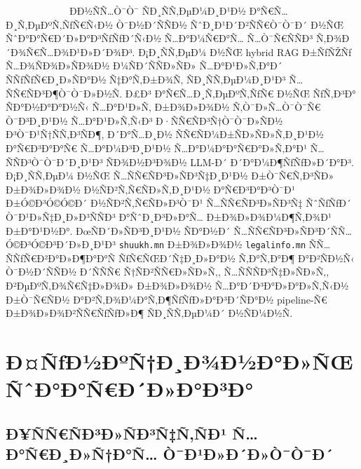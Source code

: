 \documentclass[12pt,A4]{report}
\begin{document}
\ \ \ \ \ \ \ \ \  \ \ \ \ Ð­Ð½ÑÑ…Ò¯Ò¯ ÑÐ¸ÑÑ‚ÐµÐ¼Ð¸Ð¹Ð½ Ð°Ñ€Ñ…Ð¸Ñ‚ÐµÐºÑ‚ÑƒÑ€Ñ‹Ð½ Ò¯Ð½Ð´ÑÑÐ½
ÑˆÐ¸Ð¹Ð´Ð²ÑÑ€Ò¯Ò¯Ð´ Ð½ÑŒ ÑˆÐ°Ð°Ñ€Ð´Ð»Ð°Ð³ÑƒÑƒÐ´Ñ‹Ð½ Ñ…Ð°Ð¼Ñ€Ð°Ñ… Ñ…Ò¯Ñ€ÑÑÐ³ Ñ‚Ð¾Ð´Ð¾Ñ€Ñ…Ð¾Ð¹Ð»Ð´Ð¾Ð³.
Ð¡Ð¸ÑÑ‚ÐµÐ¼ Ð½ÑŒ hybrid RAG Ð±ÑƒÑŽÑƒ Ñ…Ð¾ÑÐ¾Ð»ÑÐ¾Ð½ Ð¼ÑÐ´ÑÑÐ»ÑÐ» Ñ…Ð°Ð¹Ð»Ñ‚Ð°Ð´
ÑÑƒÑƒÑ€Ð¸Ð»ÑÐ°Ð½ Ñ‡Ð°Ñ‚Ð±Ð¾Ñ‚ ÑÐ¸ÑÑ‚ÐµÐ¼Ð¸Ð¹Ð³ Ñ…ÑÑ€ÑÐ³Ð¶Ò¯Ò¯Ð»Ð½Ñ. Ð£Ð³ Ð°Ñ€Ñ…Ð¸Ñ‚ÐµÐºÑ‚ÑƒÑ€ Ð½ÑŒ
ÑƒÑ‚Ð³Ð° ÑÐ°Ð½Ð°Ð°Ð½Ñ‹ Ñ…Ð°Ð¹Ð»Ñ‚ Ð±Ð¾Ð»Ð¾Ð½ Ñ‚Ò¯Ð»Ñ…Ò¯Ò¯Ñ€ Ò¯Ð³Ð¸Ð¹Ð½ Ñ…Ð°Ð¹Ð»Ñ‚Ñ‹Ð³ Ð·ÑÑ€ÑÐ³Ñ†Ò¯Ò¯Ð»ÑÐ½
Ð³Ò¯Ð¹Ñ†ÑÑ‚Ð³ÑÐ¶, Ð´Ð°Ñ…Ð¸Ð½ ÑÑ€ÑÐ¼Ð±ÑÐ»ÑÐ»Ñ‚Ð¸Ð¹Ð½ Ð°Ñ€Ð³Ð°Ð°Ñ€ Ñ…Ð°Ð¼Ð³Ð¸Ð¹Ð½ Ñ…Ð°Ð¼Ð°Ð°Ñ€Ð°Ð»Ñ‚Ð°Ð¹
Ñ…ÑÑÐ³Ò¯Ò¯Ð´Ð¸Ð¹Ð³ ÑÐ¾Ð½Ð³Ð¾Ð½ LLM-Ð´ Ð´Ð°Ð¼Ð¶ÑƒÑƒÐ»Ð´Ð°Ð³. Ð¡Ð¸ÑÑ‚ÐµÐ¼ Ð½ÑŒ Ñ…ÑÑ€ÑÐ³Ð»ÑÐ³Ñ‡Ð¸Ð¹Ð½
Ð±Ò¯Ñ€Ñ‚Ð³ÑÐ» Ð±Ð¾Ð»Ð¾Ð½ Ð½ÑÐ²Ñ‚Ñ€ÑÐ»Ñ‚Ð¸Ð¹Ð½ Ð°Ñ€Ð³Ð°Ð³Ò¯Ð¹ Ð±Ó©Ð³Ó©Ó©Ð´ Ð½ÑÐ²Ñ‚Ñ€ÑÐ»Ð³Ò¯Ð¹
Ñ…ÑÑ€ÑÐ³Ð»ÑÐ³Ñ‡ ÑˆÑƒÑƒÐ´ Ò¯Ð¹Ð»Ñ‡Ð¸Ð»Ð³ÑÑÐ³ Ð°ÑˆÐ¸Ð³Ð»Ð°Ñ… Ð±Ð¾Ð»Ð¾Ð¼Ð¶Ñ‚Ð¾Ð¹ Ð±Ð°Ð¹Ð½Ð°. ÐœÑÐ´Ð»ÑÐ³Ð¸Ð¹Ð½
ÑÐ°Ð½Ð´ Ñ…ÑÑ€ÑÐ³Ð»ÑÐ³Ð´ÑÑ… Ó©Ð³Ó©Ð³Ð´Ð»Ð¸Ð¹Ð³ \texttt{shuukh.mn} Ð±Ð¾Ð»Ð¾Ð½
\texttt{legalinfo.mn} ÑÑ… ÑÑƒÑ€Ð²Ð°Ð»Ð¶Ð°Ð°Ñ ÑƒÑ€ÑŒÐ´Ñ‡Ð¸Ð»Ð°Ð½ Ñ‚Ð°Ñ‚Ð°Ð¶ Ð°Ð²ÑÐ½Ñ‹
Ò¯Ð½Ð´ÑÑÐ½ Ð´ÑÑÑ€ Ñ†ÑÐ²ÑÑ€Ð»ÑÐ»Ñ‚, Ñ…ÑÑÑÐ³Ñ‡Ð»ÑÐ»Ñ‚, Ð²ÐµÐºÑ‚Ð¾Ñ€Ñ‡Ð»Ð¾Ð» Ð±Ð¾Ð»Ð¾Ð½ Ñ…Ð°Ð´Ð³Ð°Ð»Ð°Ð»Ñ‚Ñ‹Ð½
Ð±Ò¯Ñ€ÑÐ½ Ð°Ð²Ñ‚Ð¾Ð¼Ð°Ñ‚Ð¶ÑƒÑƒÐ»Ð°Ð³Ð´ÑÐ°Ð½ pipeline-Ñ€ Ð±Ð¾Ð»Ð¾Ð²ÑÑ€ÑƒÑƒÐ»Ð¶ ÑÐ¸ÑÑ‚ÐµÐ¼Ð´ Ð½ÑÐ¼Ð½Ñ.

\section{Ð¤ÑƒÐ½ÐºÑ†Ð¸Ð¾Ð½Ð°Ð»ÑŒ ÑˆÐ°Ð°Ñ€Ð´Ð»Ð°Ð³Ð°}

\subsection{Ð¥ÑÑ€ÑÐ³Ð»ÑÐ³Ñ‡Ñ‚ÑÐ¹ Ñ…Ð°Ñ€Ð¸Ð»Ñ†Ð°Ñ… Ò¯Ð¹Ð»Ð´Ð»Ò¯Ò¯Ð´}
\end{document}
